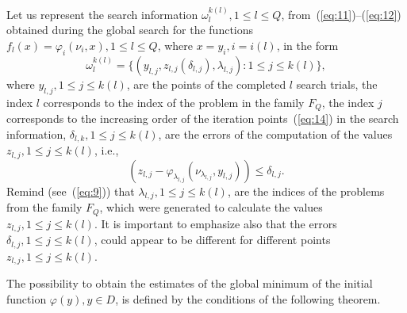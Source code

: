 \documentclass[smallextended]{svjour3}
\let\origref\ref
\renewcommand{\ref}[1]{(\origref{#1})}
\begin{document}
Let us represent the search information $\omega_l^{k(l)}, 1 \leq l \leq Q$, from~\ref{eq:11}--\ref{eq:12} obtained during the global search for the functions $f_l(x) = \varphi_i(\nu_i, x), 1 \leq l \leq Q$, where $x = y_i, i = i(l)$, in the form
\begin{equation}
\label{eq:21}
\omega_l^{k(l)} = \{ (y_{l, j}, z_{l, j}(\delta_{l, j}), \lambda_{l, j}): 1 \leq j \leq k(l) \},
\end{equation}
%
where $y_{l, j}, 1 \leq j \leq k(l)$, are the points of the completed $l$ search trials, the index $l$ corresponds to the index of the problem in the family $F_Q$, the index $j$ corresponds to the increasing order of the iteration points~\ref{eq:14} in the search information, $\delta_{l, k}, 1 \leq j \leq k(l)$, are the errors of the computation of the values $z_{l, j}, 1 \leq j \leq k(l)$, i.e.,
\begin{equation}
\label{eq:22}
(z_{l, j} - \varphi_{\lambda_{l, j}}(\nu_{\lambda_{l, j}}, y_{l, j})) \leq \delta_{l, j}.
\end{equation}
%
Remind (see~\ref{eq:9}) that $\lambda_{l, j}, 1 \leq j \leq k(l)$, are the indices of the problems from the family $F_Q$, which were generated to calculate the values $z_{l, j}, 1 \leq j \leq k(l)$. It is important to emphasize also that the errors $\delta_{l, j}, 1 \leq j \leq k(l)$, could appear to be different for different points $z_{l, j}, 1 \leq j \leq k(l)$.

The possibility to obtain the estimates of the global minimum of the initial function $\varphi(y), y \in D$, is defined by the conditions of the following theorem.
\end{document}
